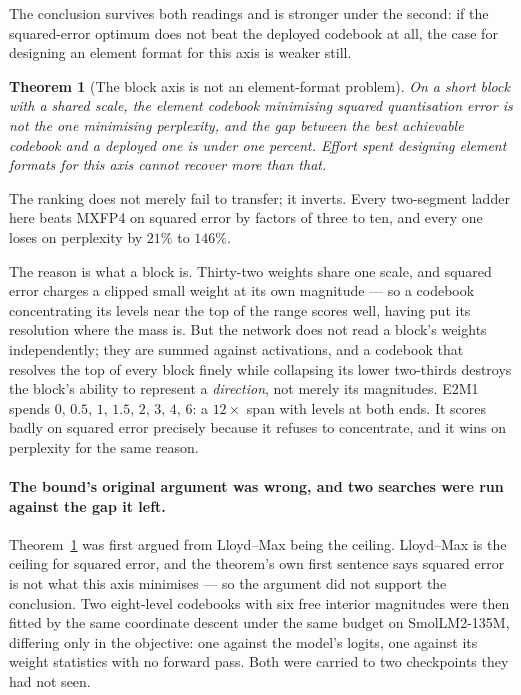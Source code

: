 \documentclass[11pt]{article}
\newtheorem{theorem}{Theorem}
\theoremstyle{definition}
\begin{document}
The conclusion survives both readings and is stronger under the second: if the
squared-error optimum does not beat the deployed codebook at all, the case for
designing an element format for this axis is weaker still.

\begin{theorem}[The block axis is not an element-format problem]\label{thm:block}
On a short block with a shared scale, the element codebook minimising squared
quantisation error is not the one minimising perplexity, and the gap between the
best achievable codebook and a deployed one is under one percent. Effort spent
designing element formats for this axis cannot recover more than that.
\end{theorem}

The ranking does not merely fail to transfer; it inverts. Every two-segment
ladder here beats MXFP4 on squared error by factors of three to ten, and every
one loses on perplexity by $21\%$ to $146\%$.

The reason is what a block is. Thirty-two weights share one scale, and squared
error charges a clipped small weight at its own magnitude --- so a codebook
concentrating its levels near the top of the range scores well, having put its
resolution where the mass is. But the network does not read a block's weights
independently; they are summed against activations, and a codebook that
resolves the top of every block finely while collapsing its lower two-thirds
destroys the block's ability to represent a \emph{direction}, not merely its
magnitudes. E2M1 spends $0,\,0.5,\,1,\,1.5,\,2,\,3,\,4,\,6$: a $12\times$ span
with levels at both ends. It scores badly on squared error precisely because it
refuses to concentrate, and it wins on perplexity for the same reason.

\paragraph{The bound's original argument was wrong, and two searches were run
against the gap it left.} Theorem~\ref{thm:block} was first argued from
Lloyd--Max being the ceiling. Lloyd--Max is the ceiling for squared error, and
the theorem's own first sentence says squared error is not what this axis
minimises --- so the argument did not support the conclusion. Two eight-level
codebooks with six free interior magnitudes were then fitted by the same
coordinate descent under the same budget on SmolLM2-135M, differing only in the
objective: one against the model's logits, one against its weight statistics with
no forward pass. Both were carried to two checkpoints they had not seen.
\end{document}
